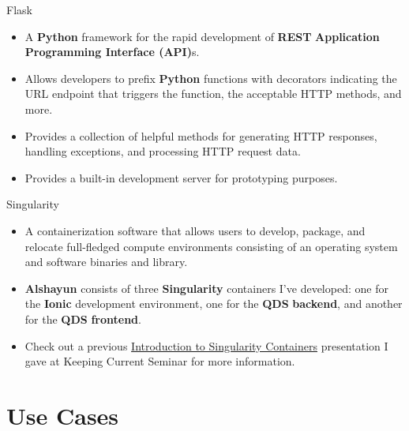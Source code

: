 \documentclass{beamer}
\begin{document}
\begin{frame}{Flask}
    \begin{itemize}
        \item A \textbf{Python} framework for the rapid development of
            \textbf{REST} \textbf{Application Programming Interface (API)}s.
        \item Allows developers to prefix \textbf{Python} functions with
            decorators indicating the URL endpoint that triggers the function,
            the acceptable HTTP methods, and more.
        \item Provides a collection of helpful methods for generating HTTP
            responses, handling exceptions, and processing HTTP request data.
        \item Provides a built-in development server for prototyping purposes.
    \end{itemize}
\end{frame}

\begin{frame}{Singularity}
    \begin{itemize}
        \item A containerization software that allows users to develop, package,
            and relocate full-fledged compute environments consisting of an
            operating system and software binaries and library.
        \item \textbf{Alshayun} consists of three \textbf{Singularity}
            containers I've developed: one for the \textbf{Ionic} development
            environment, one for the \textbf{QDS} \textbf{backend}, and another
            for the \textbf{QDS} \textbf{frontend}.
        \item Check out a previous
            \href{https://youtu.be/NeTRm7_JwX8}{Introduction to Singularity
            Containers} presentation I gave at Keeping Current Seminar for more
            information.
    \end{itemize}
\end{frame}

\section{Use Cases}
\end{document}
